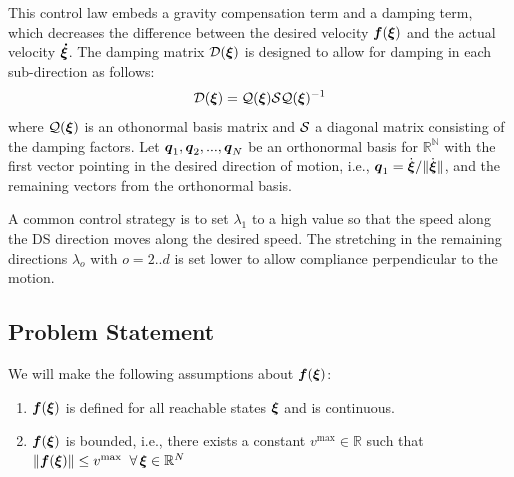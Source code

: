 \documentclass[conference]{IEEEtran}
\begin{document}
This control law embeds a gravity compensation term and a damping term, which decreases the difference between the desired velocity $\boldsymbol{f}(\boldsymbol{\xi})$ and the actual velocity $\boldsymbol{\dot\xi}$.
The damping matrix $\mathcal{D}(\boldsymbol{\xi})$ is designed to allow for damping in each sub-direction as follows:
\begin{equation}
  \matd {D}(\vecs \xi) = \matd{Q}(\vecs\xi)\matd{S} \matd{Q} (\vecs \xi)^{-1}
\label{D_matrix_shaping}
\end{equation}
where $\mathcal{Q}(\boldsymbol{\xi})$ is an othonormal basis matrix and $\mathcal{S}$ a diagonal matrix consisting of the damping factors. Let $\boldsymbol{q}_1, \boldsymbol{q}_2, ..., \boldsymbol{q}_N$ be an orthonormal basis for $\mathbb{R^N}$ with the first vector pointing in the desired direction of motion, i.e., $\boldsymbol{q}_1 = \dot{\boldsymbol{\xi}} / \lVert \dot{\boldsymbol{\xi}} \rVert$, and the remaining vectors from the orthonormal basis.

A common control strategy is to set $\lambda_1$ to a high value so that the speed along the DS direction moves along the desired speed. The stretching in the remaining directions $\lambda_o$ with $o = 2 .. d$ is set lower to allow compliance perpendicular to the motion. 


\subsection{Problem Statement}
We will make the following assumptions about $\boldsymbol{f}(\boldsymbol{\xi})$:
\begin{enumerate}
    \item $ \boldsymbol{f}(\boldsymbol{\xi})$ is defined for all reachable states $\boldsymbol{\xi}$ and is continuous.
    \item $\boldsymbol{f}(\boldsymbol{\xi})$ is bounded, i.e., there exists a constant $v^{\mathrm{max}} \in \mathbb{R}$ such that $\| \boldsymbol{f}(\boldsymbol{\xi}) \| \leq v^{\mathrm{max}} \;\; \forall \, \boldsymbol{\xi} \in \mathbb{R}^N$
\end{enumerate}
\end{document}
